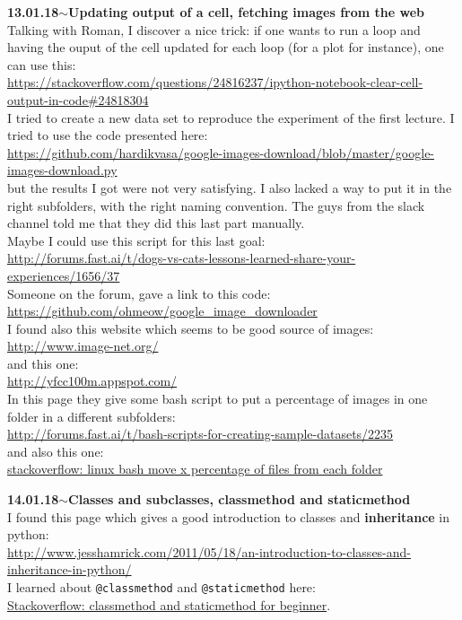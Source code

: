 \documentclass[11pt,a4paper]{article}
\newenvironment{loggentry}[2]%
{\noindent\textbf{#1}\hspace{1cm}$\mathbf{\sim}$\text{ }\textbf{#2}\\}{\vspace{0.5cm}}
\begin{document}
\begin{loggentry}{13.01.18}{Updating output of a cell, fetching images from the web}
Talking with Roman, I discover a nice trick: if one wants to run a loop and having the ouput of the cell updated for each loop (for a plot for instance), one can use this:\\
\url{https://stackoverflow.com/questions/24816237/ipython-notebook-clear-cell-output-in-code#24818304}\\
I tried to create a new data set to reproduce the experiment of the first lecture. I tried to use the code presented here:\\
\url{https://github.com/hardikvasa/google-images-download/blob/master/google-images-download.py}\\
but the results I got were not very satisfying. I also lacked a way to put it in the right subfolders, with the right naming convention. The guys from the slack channel told me that they did this last part manually.\\
Maybe I could use this script for this last goal:\\
\url{http://forums.fast.ai/t/dogs-vs-cats-lessons-learned-share-your-experiences/1656/37}\\
Someone on the forum, gave a link to this code:\\
\url{https://github.com/ohmeow/google_image_downloader}\\
I found also this website which seems to be good source of images:\\
\url{http://www.image-net.org/}\\
and this one:\\
\url{http://yfcc100m.appspot.com/}\\
In this page they give some bash script to put a percentage of images in one folder in a different subfolders:\\
\url{http://forums.fast.ai/t/bash-scripts-for-creating-sample-datasets/2235}\\
and also this one:\\
\href{https://stackoverflow.com/questions/36476326/linux-bash-move-x-percentage-of-files-from-each-folder}{stackoverflow: linux bash move x percentage of files from each folder}\\
\end{loggentry}

\begin{loggentry}{14.01.18}{Classes and subclasses, classmethod and staticmethod}
I found this page which gives a good introduction to classes and \textbf{inheritance} in python:\\
\url{http://www.jesshamrick.com/2011/05/18/an-introduction-to-classes-and-inheritance-in-python/}\\
I learned about \texttt{@classmethod} and \texttt{@staticmethod} here:\\
\href{https://stackoverflow.com/questions/12179271/meaning-of-classmethod-and-staticmethod-for-beginner}{Stackoverflow: classmethod and staticmethod for beginner}.
\end{loggentry}
\end{document}
